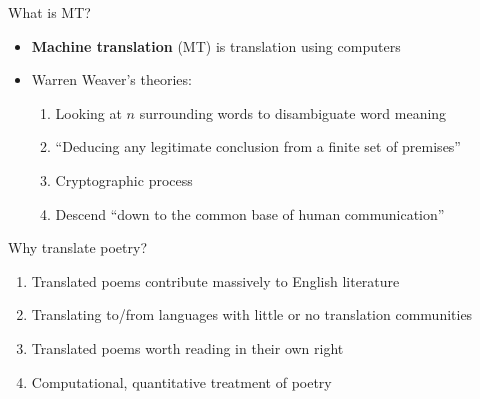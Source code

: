 \documentclass[notes]{beamer}
\begin{document}
\begin{frame}{What is MT?}
  \begin{itemize}
  \item {\bf Machine translation} (MT) is translation using computers
  \item Warren Weaver's theories:
    \begin{enumerate}
    \item Looking at $n$ surrounding words to disambiguate word meaning
    \item ``Deducing any legitimate conclusion from a finite set of
      premises''
    \item Cryptographic process
    \item Descend ``down to the common base of human communication''
    \end{enumerate}
  \end{itemize}
\end{frame}

\begin{frame}{Why translate poetry?}
  \begin{enumerate}
  \item Translated poems contribute massively to English literature
  \item Translating to/from languages with little or no translation
    communities
  \item Translated poems worth reading in their own right
  \item Computational, quantitative treatment of poetry
  \end{enumerate}
\end{frame}
\end{document}
